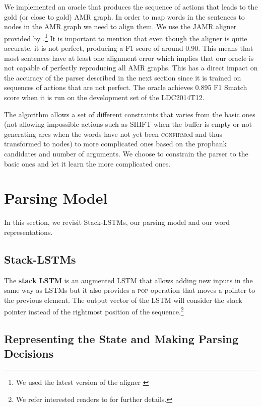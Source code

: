 \documentclass[11pt,a4paper]{article}
\begin{document}
We implemented an oracle that produces the sequence of actions that leads to the 
  gold (or close to gold) AMR graph. In order to map words in the sentences to nodes in the AMR graph we 
  need to align them. We use the JAMR aligner provided by 
  .\footnote{We used the latest version of the aligner \cite{flanigan2016cmu}}
  It is important to mention that even though the 
  aligner is quite accurate, it is not perfect, producing a F1 score of around 0.90. This means that most 
  sentences have at least one alignment error which implies that our oracle is 
  not capable of perfectly reproducing all AMR graphs. This has a direct impact on the 
 accuracy of the parser described in the next section since it is trained on 
sequences of actions that are not perfect.
The oracle achieves 0.895 F1 Smatch score \cite{cai2013smatch} when it is run on the development
 set of the LDC2014T12.
   
 The algorithm allows a set of different constraints that varies from the basic 
 ones (not allowing impossible actions such as \textsc{SHIFT} when the buffer is empty or not generating
 arcs when the words have not yet been \textsc{confirm}ed and thus transformed to nodes) 
 to more complicated ones based on the propbank candidates and number of arguments. We choose 
 to constrain the parser to the basic ones and let it learn the more complicated ones.  
  
 \section{Parsing Model}

In this section, we revisit Stack-LSTMs, our parsing model and our word representations.

\subsection{Stack-LSTMs}



The \textbf{stack LSTM} is an augmented LSTM \cite{hochreiter:1997,graves:2013} that allows adding 
new inputs in the same way as LSTMs
but it also provides a \textsc{pop} operation that moves a pointer to the previous element.  
The output vector of the LSTM will consider the stack pointer instead of the rightmost position
 of the sequence.\footnote{We refer interested readers to \cite{lstmacl15} for further 
 details.}
 
 \subsection{Representing the State and Making Parsing Decisions}
 \label{staterep}
 
\end{document}
